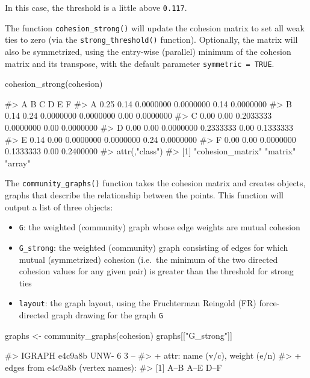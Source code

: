 In this case, the threshold is a little above \texttt{0.117}.

The function \texttt{cohesion\_strong()} will update the cohesion matrix
to set all weak ties to zero (via the \texttt{strong\_threshold()}
function). Optionally, the matrix will also be symmetrized, using the
entry-wise (parallel) minimum of the cohesion matrix and its transpose,
with the default parameter \texttt{symmetric\ =\ TRUE}.

\begin{Schunk}
\begin{Sinput}
cohesion_strong(cohesion)
\end{Sinput}
\begin{Soutput}
#>      A    B         C         D    E         F
#> A 0.25 0.14 0.0000000 0.0000000 0.14 0.0000000
#> B 0.14 0.24 0.0000000 0.0000000 0.00 0.0000000
#> C 0.00 0.00 0.2033333 0.0000000 0.00 0.0000000
#> D 0.00 0.00 0.0000000 0.2333333 0.00 0.1333333
#> E 0.14 0.00 0.0000000 0.0000000 0.24 0.0000000
#> F 0.00 0.00 0.0000000 0.1333333 0.00 0.2400000
#> attr(,"class")
#> [1] "cohesion_matrix" "matrix"          "array"
\end{Soutput}
\end{Schunk}

The \texttt{community\_graphs()} function takes the cohesion matrix and
creates  objects, graphs that describe the relationship
between the points. This function will output a list of three objects:

\begin{itemize}
\tightlist
\item
  \texttt{G}: the weighted (community) graph whose edge weights are
  mutual cohesion
\item
  \texttt{G\_strong}: the weighted (community) graph consisting of edges
  for which mutual (symmetrized) cohesion (i.e.~the minimum of the two
  directed cohesion values for any given pair) is greater than the
  threshold for strong ties
\item
  \texttt{layout}: the graph layout, using the Fruchterman Reingold (FR)
  force-directed graph drawing for the graph \texttt{G}
\end{itemize}

\begin{Schunk}
\begin{Sinput}
graphs <- community_graphs(cohesion)
graphs[["G_strong"]]
\end{Sinput}
\begin{Soutput}
#> IGRAPH e4c9a8b UNW- 6 3 -- 
#> + attr: name (v/c), weight (e/n)
#> + edges from e4c9a8b (vertex names):
#> [1] A--B A--E D--F
\end{Soutput}
\end{Schunk}

